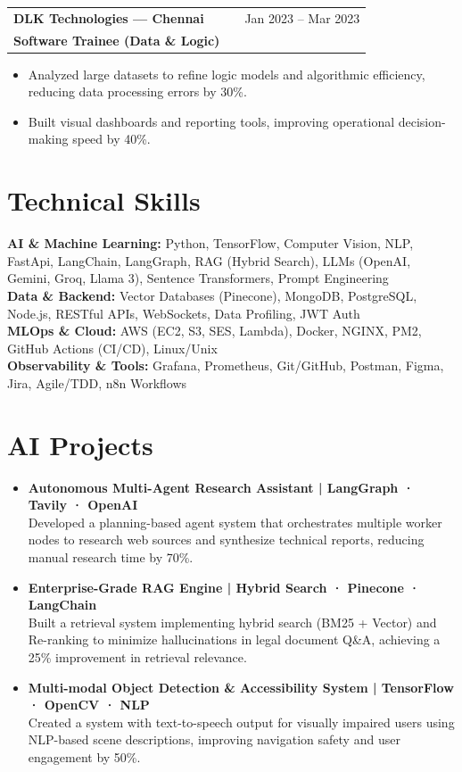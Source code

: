 \documentclass[a4paper,10pt]{article}
\begin{document}
\vspace{4pt}

\begin{tabularx}{\linewidth}{ @{}l X r@{} }
\textbf{DLK Technologies — Chennai} & & \hfill \color[HTML]{371e77} Jan 2023 -- Mar 2023 \\
\color[HTML]{371e77}\textbf{Software Trainee (Data \& Logic)} & & \\
\end{tabularx}
\begin{itemize}[nosep, leftmargin=2em]
\item Analyzed large datasets to refine logic models and algorithmic efficiency, reducing data processing errors by 30\%.
\item Built visual dashboards and reporting tools, improving operational decision-making speed by 40\%.
\end{itemize}

\section{Technical Skills}
\noindent
\color[HTML]{1C033C}\textbf{AI \& Machine Learning:} Python, TensorFlow, Computer Vision, NLP, FastApi, LangChain, LangGraph, RAG (Hybrid Search), LLMs (OpenAI, Gemini, Groq, Llama 3), Sentence Transformers, Prompt Engineering \\
\color[HTML]{1C033C}\textbf{Data \& Backend:} Vector Databases (Pinecone), MongoDB, PostgreSQL, Node.js, RESTful APIs, WebSockets, Data Profiling, JWT Auth \\
\color[HTML]{1C033C}\textbf{MLOps \& Cloud:} AWS (EC2, S3, SES, Lambda), Docker, NGINX, PM2, GitHub Actions (CI/CD), Linux/Unix \\
\color[HTML]{1C033C}\textbf{Observability \& Tools:} Grafana, Prometheus, Git/GitHub, Postman, Figma, Jira, Agile/TDD, n8n Workflows

\section{AI Projects}
\begin{itemize}[nosep, leftmargin=2em]
\item \textbf{Autonomous Multi-Agent Research Assistant | LangGraph · Tavily · OpenAI} \\
Developed a planning-based agent system that orchestrates multiple worker nodes to research web sources and synthesize technical reports, reducing manual research time by 70\%.
\item \textbf{Enterprise-Grade RAG Engine | Hybrid Search · Pinecone · LangChain} \\
Built a retrieval system implementing hybrid search (BM25 + Vector) and Re-ranking to minimize hallucinations in legal document Q\&A, achieving a 25\% improvement in retrieval relevance.
\item \textbf{Multi-modal Object Detection \& Accessibility System | TensorFlow · OpenCV · NLP} \\
Created a system with text-to-speech output for visually impaired users using NLP-based scene descriptions, improving navigation safety and user engagement by 50\%.
\end{itemize}
\end{document}
